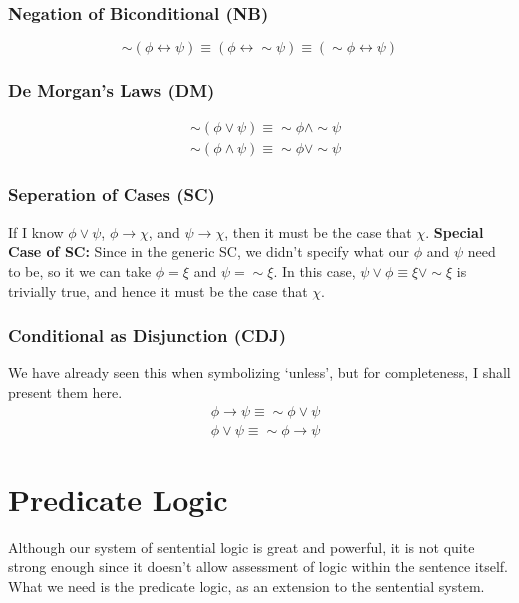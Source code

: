 \documentclass[10pt]{article}
\renewcommand{\iff}{\leftrightarrow}
\renewcommand{\implies}{\rightarrow}
\begin{document}
\subsubsection{Negation of Biconditional (NB)}
\begin{equation*}
    \sim (\phi\iff \psi) \equiv (\phi \iff \sim \psi) \equiv (\sim \phi \iff \psi)
\end{equation*}
\subsubsection{De Morgan's Laws (DM)}
\begin{align*}
    &\sim (\phi \vee \psi) \equiv \sim \phi \land \sim \psi \\
    &\sim (\phi \land \psi) \equiv \sim \phi \vee \sim \psi
\end{align*}

\subsubsection{Seperation of Cases (SC)}
If I know $\phi \vee \psi$, $\phi \implies \chi$, and $\psi \implies \chi$, then
it must be the case that $\chi$. \textbf{Special Case of SC:} Since in the generic
SC, we didn't specify what our $\phi$ and $\psi$ need to be, so it we can take $\phi = \xi$
and $\psi = \sim \xi$. In this case, $\psi \vee \phi \equiv \xi \vee \sim \xi$ is
trivially true, and hence it must be the case that $\chi$.

\subsubsection{Conditional as Disjunction (CDJ)}
We have already seen this when symbolizing `unless', but for completeness, I shall
present them here.
\begin{align*}
    &\phi \implies \psi \equiv \sim \phi \vee \psi \\
    &\phi \vee \psi \equiv \sim \phi \implies \psi
\end{align*}

\section{Predicate Logic}
Although our system of sentential logic is great and powerful, it is not quite strong enough since it doesn't allow assessment of logic within the sentence itself. What we need is the predicate logic, as an extension to the sentential system. 
\end{document}
